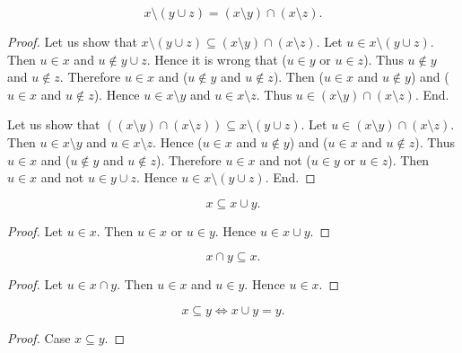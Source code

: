 \documentclass[../../sets-and-functions.ftl.tex]{subfiles}
\begin{document}
\begin{forthel}
    \begin{proposition}\label{SetTheory_01_01_403962}
      \[ x \setminus (y \cup z) = (x \setminus y) \cap (x \setminus z). \]
    \end{proposition}
    \begin{proof}
      Let us show that $x \setminus (y \cup z) \subseteq (x \setminus y) \cap (x \setminus z)$.
        Let $u \in x \setminus (y \cup z)$.
        Then $u \in x$ and $u \notin y \cup z$.
        Hence it is wrong that ($u \in y$ or $u \in z$).
        Thus $u \notin y$ and $u \notin z$.
        Therefore $u \in x$ and ($u \notin y$ and $u \notin z$).
        Then ($u \in x$ and $u \notin y$) and ($u \in x$ and $u \notin z$).
        Hence $u \in x \setminus y$ and $u \in x \setminus z$.
        Thus $u \in (x \setminus y) \cap (x \setminus z)$.
      End.

      Let us show that $((x \setminus y) \cap (x \setminus z)) \subseteq
      x \setminus (y \cup z)$.
        Let $u \in (x \setminus y) \cap (x \setminus z)$.
        Then $u \in x \setminus y$ and $u \in x \setminus z$.
        Hence ($u \in x$ and $u \notin y$) and ($u \in x$ and $u \notin z$).
        Thus $u \in x$ and ($u \notin y$ and $u \notin z$).
        Therefore $u \in x$ and not ($u \in y$ or $u \in z$).
        Then $u \in x$ and not $u \in y \cup z$.
        Hence $u \in x \setminus (y \cup z)$.
      End.
    \end{proof}

    \begin{proposition}\label{SetTheory_01_01_628970}
      \[ x \subseteq x \cup y. \]
    \end{proposition}
    \begin{proof}
      Let $u \in x$.
      Then $u \in x$ or $u \in y$.
      Hence $u \in x \cup y$.
    \end{proof}


    \begin{proposition}\label{SetTheory_01_01_368515}
      \[ x \cap y \subseteq x. \]
    \end{proposition}
    \begin{proof}
      Let $u \in x \cap y$.
      Then $u \in x$ and $u \in y$.
      Hence $u \in x$.
    \end{proof}


    \begin{proposition}\label{SetTheory_01_01_591527}
      \[ x \subseteq y \iff x \cup y = y. \]
    \end{proposition}
    \begin{proof}
      Case $x \subseteq y$.


\end{proof}
\end{forthel}
\end{document}
